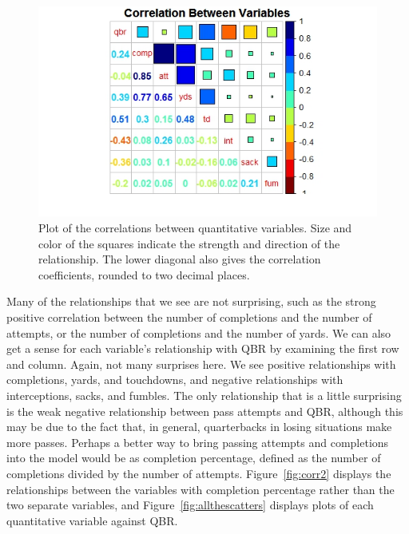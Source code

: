 \documentclass[12pt]{article}\usepackage[]{graphicx}\usepackage[]{color}
\begin{document}
\begin{figure}[h]
\centering
\includegraphics[width=1.2\textwidth]{correlation.jpeg}
\captionsetup{font=footnotesize,labelfont=footnotesize}
\caption{\label{fig:corr} Plot of the correlations between quantitative variables. Size and color of the squares indicate the strength and direction of the relationship. The lower diagonal also gives the correlation coefficients, rounded to two decimal places.}
\end{figure}

Many of the relationships that we see are not surprising, such as the strong positive correlation between the number of completions and the number of attempts, or the number of completions and the number of yards. We can also get a sense for each variable's relationship with QBR by examining the first row and column. Again, not many surprises here. We see positive relationships with completions, yards, and touchdowns, and negative relationships with interceptions, sacks, and fumbles. The only relationship that is a little surprising is the weak negative relationship between pass attempts and QBR, although this may be due to the fact that, in general, quarterbacks in losing situations make more passes. Perhaps a better way to bring passing attempts and completions into the model would be as completion percentage, defined as the number of completions divided by the number of attempts. Figure~\ref{fig:corr2} displays the relationships between the variables with completion percentage rather than the two separate variables, and Figure~\ref{fig:allthescatters} displays plots of each quantitative variable against QBR.
\end{document}
